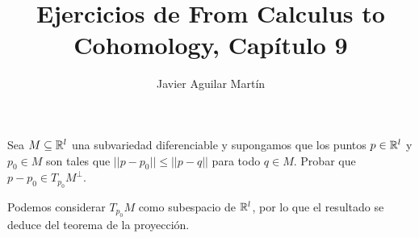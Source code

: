 \documentclass[twoside]{article}
\begin{document}
\title{Ejercicios de From Calculus to Cohomology, Capítulo 9}
\author{Javier Aguilar Martín}
\maketitle

\begin{ejercicio}{9.1}
Sea $M\subseteq\mathbb{R}^l$ una subvariedad diferenciable y supongamos que los puntos $p\in\mathbb{R}^l$ y $p_0\in M$ son tales que $||p-p_0||\leq ||p-q||$ para todo $q\in M$. Probar que $p-p_0\in T_{p_0}M^{\perp}$.
\end{ejercicio}
\begin{solucion}
Podemos considerar $T_{p_0}M$ como subespacio de $\mathbb{R}^l$, por lo que el resultado se deduce del teorema de la proyección. 
\end{solucion}
\newpage

\begin{ejercicio}{9.2}

\end{ejercicio}
\begin{solucion}

\end{solucion}
\newpage

\begin{ejercicio}{9.3}

\end{ejercicio}
\begin{solucion}

\end{solucion}
\newpage

\begin{ejercicio}{9.4}
 
\end{ejercicio}
\begin{solucion}

\end{solucion}

\newpage

\begin{ejercicio}{9.5}

\end{ejercicio}
\begin{solucion}

\end{solucion}

\newpage

\begin{ejercicio}{9.6}

\end{ejercicio}
\begin{solucion}
\end{solucion}
\newpage
\end{document}
